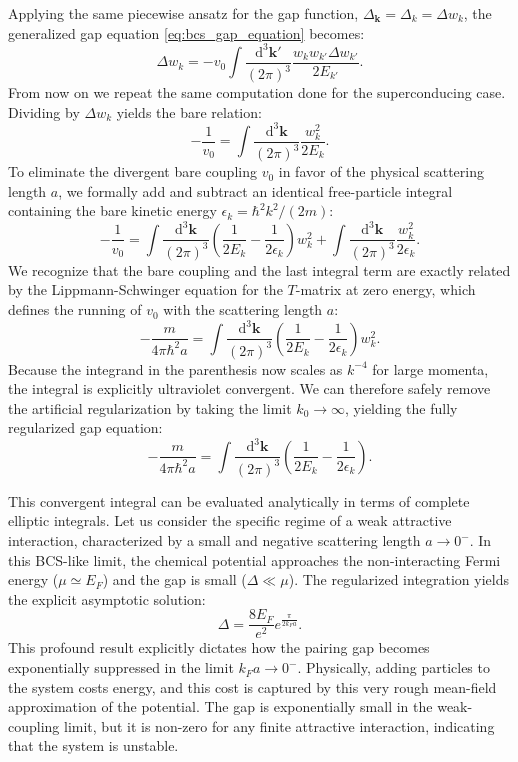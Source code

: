 Applying the same piecewise ansatz for the gap function, \( \Delta_{\mathbf{k}} = \Delta_k = \Delta w_k \), the generalized gap equation \eqref{eq:bcs_gap_equation} becomes:
\[
    \Delta w_k = -v_0 \int \frac{\mathrm{d}^3\mathbf{k}'}{(2\pi)^3} \frac{w_k w_{k'} \Delta w_{k'}}{2E_{k'}}.
\]
From now on we repeat the same computation done for the superconducing case. Dividing by \( \Delta w_k \) yields the bare relation:
\[
    -\frac{1}{v_0} = \int \frac{\mathrm{d}^3\mathbf{k}}{(2\pi)^3} \frac{w_k^2}{2E_k}.
\]
To eliminate the divergent bare coupling \( v_0 \) in favor of the physical scattering length \( a \), we formally add and subtract an identical free-particle integral containing the bare kinetic energy \( \epsilon_k = \hbar^2 k^2 / (2m) \):
\[
    -\frac{1}{v_0} = \int \frac{\mathrm{d}^3\mathbf{k}}{(2\pi)^3} \left( \frac{1}{2E_k} - \frac{1}{2\epsilon_k} \right) w_k^2 + \int \frac{\mathrm{d}^3\mathbf{k}}{(2\pi)^3} \frac{w_k^2}{2\epsilon_k}.
\]
We recognize that the bare coupling and the last integral term are exactly related by the Lippmann-Schwinger equation for the \( T \)-matrix at zero energy, which defines the running of \( v_0 \) with the scattering length \( a \):
\[
    -\frac{m}{4\pi\hbar^2 a} = \int \frac{\mathrm{d}^3\mathbf{k}}{(2\pi)^3} \left( \frac{1}{2E_k} - \frac{1}{2\epsilon_k} \right) w_k^2.
\]
Because the integrand in the parenthesis now scales as \( k^{-4} \) for large momenta, the integral is explicitly ultraviolet convergent. We can therefore safely remove the artificial regularization by taking the limit \( k_0 \to \infty \), yielding the fully regularized gap equation:
\begin{equation} \label{eq:ultracold_gap_regularized}
    -\frac{m}{4\pi\hbar^2 a} = \int \frac{\mathrm{d}^3\mathbf{k}}{(2\pi)^3} \left( \frac{1}{2E_k} - \frac{1}{2\epsilon_k} \right).
\end{equation}

This convergent integral can be evaluated analytically in terms of complete elliptic integrals. Let us consider the specific regime of a weak attractive interaction, characterized by a small and negative scattering length \( a \to 0^- \). In this BCS-like limit, the chemical potential approaches the non-interacting Fermi energy (\( \mu \simeq E_F \)) and the gap is small (\( \Delta \ll \mu \)). The regularized integration yields the explicit asymptotic solution:
\begin{equation} \label{eq:ultracold_gap_result}
    \Delta = \frac{8E_F}{e^2} e^{\frac{\pi}{2 k_F a}}.
\end{equation}
This profound result explicitly dictates how the pairing gap becomes exponentially suppressed in the limit \( k_F a \to 0^- \). Physically, adding particles to the system costs energy, and this cost is captured by this very rough mean-field approximation of the potential. The gap is exponentially small in the weak-coupling limit, but it is non-zero for any finite attractive interaction, indicating that the system is unstable.

